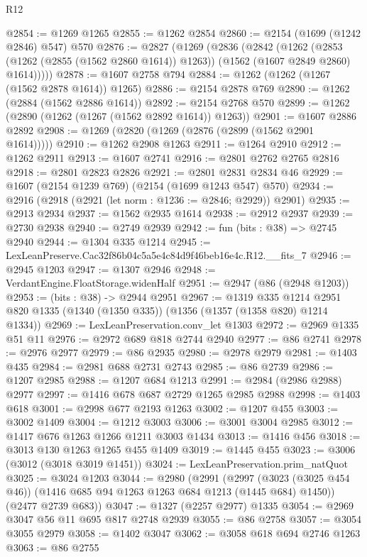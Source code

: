 \begin{lexlean}{R12}
\begin{coremodule}
@2854 := @1269 @1265
@2855 := @1262 @2854
@2860 := @2154 (@1699 (@1242 @2846) @547) @570
@2876 := @2827
    (@1269
      (@2836
        (@2842
          (@1262
            (@2853 (@1262 (@2855 (@1562 @2860 @1614)) @1263))
            (@1562 (@1607 @2849 @2860) @1614)))))
@2878 := @1607 @2758 @794
@2884 := @1262 (@1262 (@1267 (@1562 @2878 @1614)) @1265)
@2886 := @2154 @2878 @769
@2890 := @1262 (@2884 (@1562 @2886 @1614))
@2892 := @2154 @2768 @570
@2899 := @1262 (@2890 (@1262 (@1267 (@1562 @2892 @1614)) @1263))
@2901 := @1607 @2886 @2892
@2908 := @1269 (@2820 (@1269 (@2876 (@2899 (@1562 @2901 @1614)))))
@2910 := @1262 @2908 @1263
@2911 := @1264 @2910
@2912 := @1262 @2911
@2913 := @1607 @2741
@2916 := @2801 @2762 @2765 @2816
@2918 := @2801 @2823 @2826
@2921 := @2801 @2831 @2834 @46
@2929 := @1607 (@2154 @1239 @769) (@2154 (@1699 @1243 @547) @570)
@2934 := @2916 (@2918 (@2921 (let norm : @1236 := @2846; @2929)) @2901)
@2935 := @2913 @2934
@2937 := @1562 @2935 @1614
@2938 := @2912 @2937
@2939 := @2730 @2938
@2940 := @2749 @2939
@2942 := fun (bits : @38) => @2745 @2940
@2944 := @1304 @335 @1214
@2945 := LexLeanPreserve.Cac32f86b04c5a5e4c84d9f46beb16e4c.R12.__fits_7
@2946 := @2945 @1203
@2947 := @1307 @2946
@2948 := VerdantEngine.FloatStorage.widenHalf
@2951 := @2947 (@86 (@2948 @1203))
@2953 := (bits : @38) -> @2944 @2951
@2967 := @1319
    @335
    @1214
    @2951
    @820
    @1335
    (@1340 (@1350 @335))
    (@1356 (@1357 (@1358 @820) @1214 @1334))
@2969 := LexLeanPreservation.conv_let @1303
@2972 := @2969 @1335 @51 @11
@2976 := @2972 @689 @818 @2744 @2940
@2977 := @86 @2741
@2978 := @2976 @2977
@2979 := @86 @2935
@2980 := @2978 @2979
@2981 := @1403 @435
@2984 := @2981 @688 @2731 @2743
@2985 := @86 @2739
@2986 := @1207 @2985
@2988 := @1207 @684 @1213
@2991 := @2984 (@2986 @2988) @2977
@2997 := @1416 @678 @687 @2729 @1265 @2985 @2988
@2998 := @1403 @618
@3001 := @2998 @677 @2193 @1263
@3002 := @1207 @455
@3003 := @3002 @1409
@3004 := @1212 @3003
@3006 := @3001 @3004 @2985
@3012 := @1417 @676 @1263 @1266 @1211 @3003 @1434
@3013 := @1416 @456
@3018 := @3013 @130 @1263 @1265 @455 @1409
@3019 := @1445 @455
@3023 := @3006 (@3012 (@3018 @3019 @1451))
@3024 := LexLeanPreservation.prim_natQuot
@3025 := @3024 @1203
@3044 := @2980
    (@2991
      (@2997 (@3023 (@3025 @454 @46)) (@1416 @685 @94 @1263 @1263 @684 @1213 (@1445 @684) @1450))
      (@2477 @2739 @683))
@3047 := @1327 (@2257 @2977) @1335
@3054 := @2969 @3047 @56 @11 @695 @817 @2748 @2939
@3055 := @86 @2758
@3057 := @3054 @3055 @2979
@3058 := @1402 @3047
@3062 := @3058 @618 @694 @2746 @1263
@3063 := @86 @2755

\end{coremodule}
\end{lexlean}
